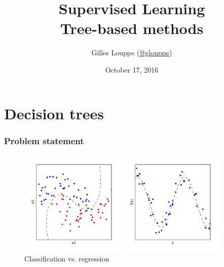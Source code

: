 \documentclass{beamer}
\title{{\bf Supervised Learning}\\
Tree-based methods}
\author{
Gilles Louppe (\href{https://twitter.com/glouppe}{@glouppe})
}
\date{October 17, 2016}
\begin{document}
\begin{frame}[plain]
\titlepage
\end{frame}





\section{Decision trees}

\begin{frame}
    \frametitle{Problem statement}

    \begin{figure}
    \centering
    \includegraphics[width=0.45\textwidth]{./figures/classification.pdf}
    \includegraphics[width=0.45\textwidth]{./figures/regression.pdf}\\
    Classification vs. regression
    \end{figure}
\end{frame}
\end{document}
